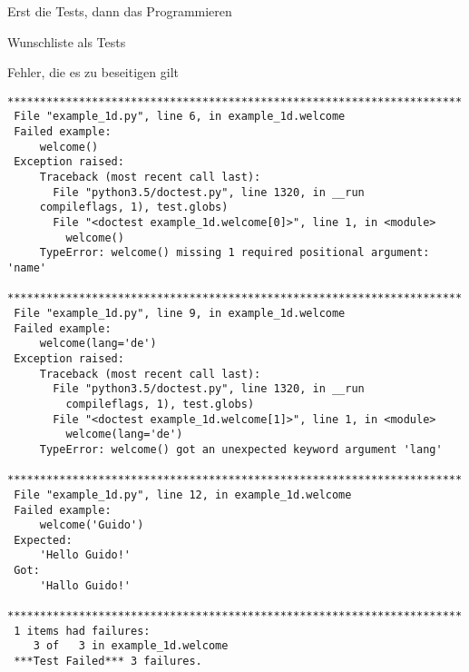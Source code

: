 \documentclass[t, utf8x, 10pt]{beamer}
\begin{document}
\begin{frame}[c]{Erst die Tests, dann das Programmieren}
 \begin{center}
  \begin{Large}
   \setlength{}	  
  \end{Large}
 \end{center}
\end{frame}


\begin{frame}[fragile]{Wunschliste als Tests}
 
\end{frame}


\begin{frame}[fragile]{Fehler, die es zu beseitigen gilt}
 \begin{tiny}
	 \begin{lstlisting}[language={}]
 **********************************************************************
 File "example_1d.py", line 6, in example_1d.welcome
 Failed example:
     welcome()
 Exception raised:
     Traceback (most recent call last):
       File "python3.5/doctest.py", line 1320, in __run
	 compileflags, 1), test.globs)
       File "<doctest example_1d.welcome[0]>", line 1, in <module>
         welcome()
     TypeError: welcome() missing 1 required positional argument: 'name'
 **********************************************************************
 File "example_1d.py", line 9, in example_1d.welcome
 Failed example:
     welcome(lang='de')
 Exception raised:
     Traceback (most recent call last):
       File "python3.5/doctest.py", line 1320, in __run
         compileflags, 1), test.globs)
       File "<doctest example_1d.welcome[1]>", line 1, in <module>
         welcome(lang='de')
     TypeError: welcome() got an unexpected keyword argument 'lang'
 **********************************************************************
 File "example_1d.py", line 12, in example_1d.welcome
 Failed example:
     welcome('Guido')
 Expected:
     'Hello Guido!'
 Got:
     'Hallo Guido!'
 **********************************************************************
 1 items had failures:
    3 of   3 in example_1d.welcome
 ***Test Failed*** 3 failures.
  \end{lstlisting}
 \end{tiny}
\end{frame}
\end{document}
